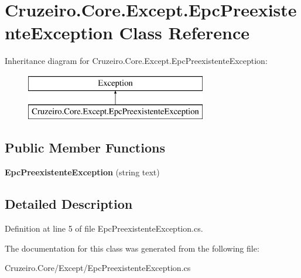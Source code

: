 \hypertarget{class_cruzeiro_1_1_core_1_1_except_1_1_epc_preexistente_exception}{}\section{Cruzeiro.\+Core.\+Except.\+Epc\+Preexistente\+Exception Class Reference}
\label{class_cruzeiro_1_1_core_1_1_except_1_1_epc_preexistente_exception}
Inheritance diagram for Cruzeiro.\+Core.\+Except.\+Epc\+Preexistente\+Exception\+:\begin{figure}[H]
\begin{center}
\leavevmode
\includegraphics[height=2.000000cm]{class_cruzeiro_1_1_core_1_1_except_1_1_epc_preexistente_exception}
\end{center}
\end{figure}
\subsection*{Public Member Functions}
\begin{DoxyCompactItemize}
\item 
{\bfseries Epc\+Preexistente\+Exception} (string text)\hypertarget{class_cruzeiro_1_1_core_1_1_except_1_1_epc_preexistente_exception_a460e97165a4bc4e0b603f1bae28d0cdb}{}\label{class_cruzeiro_1_1_core_1_1_except_1_1_epc_preexistente_exception_a460e97165a4bc4e0b603f1bae28d0cdb}

\end{DoxyCompactItemize}


\subsection{Detailed Description}


Definition at line 5 of file Epc\+Preexistente\+Exception.\+cs.



The documentation for this class was generated from the following file\+:\begin{DoxyCompactItemize}
\item 
Cruzeiro.\+Core/\+Except/Epc\+Preexistente\+Exception.\+cs\end{DoxyCompactItemize}
